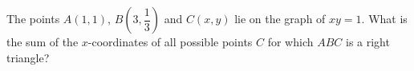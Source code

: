 The points $A(1,1)$, $B\left(3,\dfrac{1}{3}\right)$ and $C(x,y)$ lie on the graph of $xy=1$. What is the sum of the $x$-coordinates of all possible points $C$ for which $ABC$ is a right triangle?
